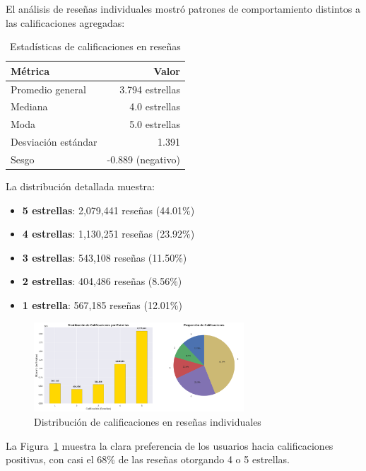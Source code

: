 \documentclass[12pt,a4paper,twoside,openany]{book}
\begin{document}
El análisis de reseñas individuales mostró patrones de comportamiento distintos a las calificaciones agregadas:

\begin{table}[H]
\centering
\caption{Estadísticas de calificaciones en reseñas}
\begin{tabular}{@{}lr@{}}
\toprule
\textbf{Métrica} & \textbf{Valor} \\
\midrule
Promedio general & 3.794 estrellas \\
Mediana & 4.0 estrellas \\
Moda & 5.0 estrellas \\
Desviación estándar & 1.391 \\
Sesgo & -0.889 (negativo) \\
\bottomrule
\end{tabular}
\end{table}

La distribución detallada muestra:
\begin{itemize}
    \item \textbf{5 estrellas}: 2,079,441 reseñas (44.01\%)
    \item \textbf{4 estrellas}: 1,130,251 reseñas (23.92\%)
    \item \textbf{3 estrellas}: 543,108 reseñas (11.50\%)
    \item \textbf{2 estrellas}: 404,486 reseñas (8.56\%)
    \item \textbf{1 estrella}: 567,185 reseñas (12.01\%)
\end{itemize}

\begin{figure}[H]
\centering
\includegraphics[width=0.7\textwidth]{figures/reviews_stars_distribution.png}
\caption{Distribución de calificaciones en reseñas individuales}
\label{fig:reviews_stars_distribution}
\end{figure}

La Figura~\ref{fig:reviews_stars_distribution} muestra la clara preferencia de los usuarios hacia calificaciones positivas, con casi el 68\% de las reseñas otorgando 4 o 5 estrellas.
\end{document}

